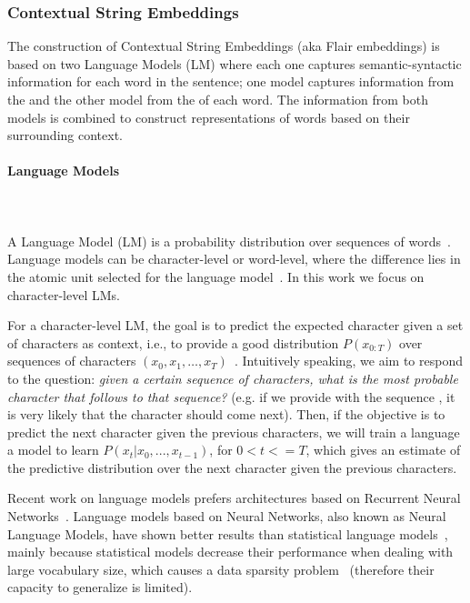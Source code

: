 \subsubsection{Contextual String Embeddings}
\label{cap2:theoFrame/infExtr/sequenceLabeling/contextualEmbeddings}
The construction of Contextual String Embeddings (aka Flair embeddings) is based on two 
Language Models (LM) where each one captures semantic-syntactic information for each word in 
the sentence; one model captures information from the  and the other model from 
the  of each word. The information from both models is combined to construct 
representations of words based on their surrounding context.

\paragraph{Language Models} 
\label{cap2:theoFrame/infExtr/sequenceLabeling/contextualEmbeddings/languageModel}
\mbox{}\\
\mbox{}\\
A Language Model (LM) is a probability distribution over sequences of words~\cite{seqlab:PonteC98}. Language models can be character-level or word-level, where the difference lies in the atomic 
unit selected for the language model~\cite{seqlab:PonteC98}. In this work we focus on character-level LMs.

For a character-level LM, 
the goal is to predict the expected character given a set of characters as context, i.e., to 
provide a good distribution $P(x_{0:T})$ over sequences of characters 
$(x_0, x_1,\ldots,x_T)$~\cite{seqlab:Graves13}. Intuitively speaking, we aim to respond to the question: 
\textit{given a certain sequence of characters, what is the most probable character that follows to that sequence?} (e.g. if we provide with the sequence , it is very likely that the character  should come next). Then, if the objective is to predict the next character given the previous characters, we will train a language a model to learn $P(x_t|x_0,..., x_{t-1})$, for $0 < t <= T$, which gives an estimate of the predictive distribution over the next character given the previous characters. 

Recent work on language models prefers architectures based on Recurrent Neural Networks~\cite{seqlab:contextual-emb-AkbikBV18}. 
Language models based on Neural Networks, also known as Neural Language Models, have shown 
better results than statistical language models~\cite{seqlab:Graves13}, mainly because 
statistical models decrease their performance when dealing with large vocabulary size, which 
causes a data sparsity problem~\cite{seqlab:Egghe07a} (therefore their capacity to generalize 
is limited). 


